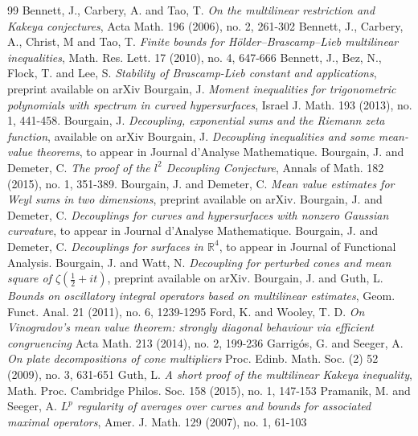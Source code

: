 \documentclass[amssymb,amsfonts,12pt]{amsart}
\def\R{{\mathbb R}}
\begin{document}
\begin{thebibliography}{99}
 Bennett, J.,  Carbery, A. and  Tao, T. {\em On the multilinear restriction and Kakeya conjectures}, Acta Math. 196 (2006), no. 2, 261-302
 Bennett, J.,  Carbery, A., Christ, M and  Tao, T. {\em  Finite bounds for H\"older--Brascamp--Lieb multilinear inequalities}, Math. Res. Lett. 17 (2010), no. 4, 647-666
 Bennett, J., Bez, N., Flock, T. and Lee, S. {\em Stability of Brascamp-Lieb constant and applications}, preprint available on arXiv
 Bourgain, J. {\em Moment inequalities for trigonometric polynomials with spectrum in curved hypersurfaces},  Israel J. Math. 193 (2013), no. 1, 441-458.
 Bourgain, J. {\em Decoupling, exponential sums and the Riemann zeta function}, available on arXiv
 Bourgain, J. {\em Decoupling inequalities and some mean-value theorems}, to appear in Journal d'Analyse Mathematique.
 Bourgain, J. and Demeter, C. {\em The proof of the $l^2$ Decoupling Conjecture}, Annals of Math. 182 (2015), no. 1, 351-389.
 Bourgain, J. and Demeter, C. {\em Mean value estimates for  Weyl sums in two dimensions}, preprint available on arXiv.
 Bourgain, J. and Demeter, C. {\em Decouplings for curves and hypersurfaces with nonzero Gaussian curvature}, to appear in Journal d'Analyse Mathematique.
 Bourgain, J. and Demeter, C. {\em Decouplings for surfaces in $\R^4$}, to appear in Journal of Functional Analysis.
 Bourgain, J. and Watt, N. {\em Decoupling for perturbed cones and mean square of $\zeta(\frac12+it)$}, preprint available on arXiv.
 Bourgain, J. and  Guth, L. {\em Bounds on oscillatory integral operators based on multilinear estimates}, Geom. Funct. Anal. 21 (2011), no. 6, 1239-1295
 Ford, K. and Wooley, T. D. {\em  On Vinogradov's mean value theorem: strongly diagonal behaviour via efficient congruencing} Acta Math. 213 (2014), no. 2, 199-236
 Garrig\'os, G. and Seeger, A. {\em On plate decompositions of cone multipliers} Proc. Edinb. Math. Soc. (2) 52 (2009), no. 3, 631-651
 Guth, L. {\em A short proof of the multilinear Kakeya inequality}, Math. Proc. Cambridge Philos. Soc. 158 (2015), no. 1, 147-153
 Pramanik, M. and Seeger, A. {\em $L^p$ regularity of averages over curves and bounds for associated maximal operators}, Amer. J. Math. 129 (2007), no. 1, 61-103

\end{thebibliography}
\end{document}
